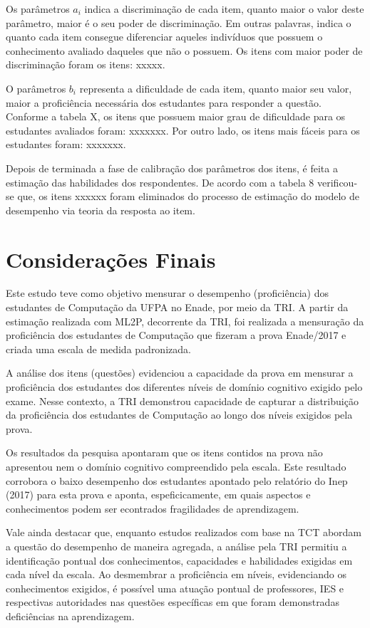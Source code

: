 \documentclass[12pt]{article}
\begin{document}
\newpage
Os parâmetros $a_{i}$ indica a discriminação de cada item, quanto maior o valor deste parâmetro, maior é o seu poder de discriminação. Em outras palavras, indica o quanto cada item consegue diferenciar aqueles indivíduos que possuem o conhecimento avaliado daqueles que não o possuem. Os itens com maior poder de discriminação foram os itens: xxxxx. 

O parâmetros $b_{i}$ representa a dificuldade de cada item, quanto maior seu valor, maior a proficiência necessária dos estudantes para responder a questão. Conforme a tabela X, os itens que possuem maior grau de dificuldade para os estudantes avaliados foram: xxxxxxx. Por outro lado, os itens mais fáceis para os estudantes foram: xxxxxxx.

Depois de terminada a fase de calibração dos parâmetros dos itens, é feita a estimação das habilidades dos respondentes. De acordo com a tabela 8 verificou-se que, os itens xxxxxx foram eliminados do processo de estimação do modelo de desempenho via teoria da resposta ao item.




\newpage
\section{Considerações Finais}

Este estudo teve como objetivo mensurar o desempenho (proficiência) dos estudantes de Computação da UFPA no Enade, por meio da TRI. A partir da estimação realizada com ML2P, decorrente da TRI, foi realizada a mensuração da proficiência dos estudantes de Computação que fizeram a prova Enade/2017 e criada uma escala de medida padronizada.

A análise dos itens (questões) evidenciou a capacidade da prova em mensurar a proficiência dos estudantes dos diferentes níveis de domínio cognitivo exigido pelo exame. Nesse contexto, a TRI demonstrou capacidade de capturar a distribuição da proficiência dos estudantes de Computação ao longo dos níveis exigidos pela prova.

Os resultados da pesquisa apontaram que os itens contidos na prova não apresentou nem o domínio cognitivo compreendido pela escala. Este resultado corrobora  o baixo desempenho dos estudantes apontado pelo relatório do Inep (2017) para esta prova e aponta, espeficicamente, em quais aspectos e conhecimentos podem ser econtrados fragilidades de aprendizagem.

Vale ainda destacar que, enquanto estudos realizados com base na TCT abordam a questão do desempenho de maneira agregada, a análise pela TRI permitiu a identificação pontual dos conhecimentos, capacidades e habilidades exigidas em cada nível da escala. Ao desmembrar a proficiência em níveis, evidenciando os conhecimentos exigidos, é possível uma atuação pontual de professores, IES e respectivas autoridades nas questões específicas em que foram demonstradas deficiências na aprendizagem. 
\end{document}

